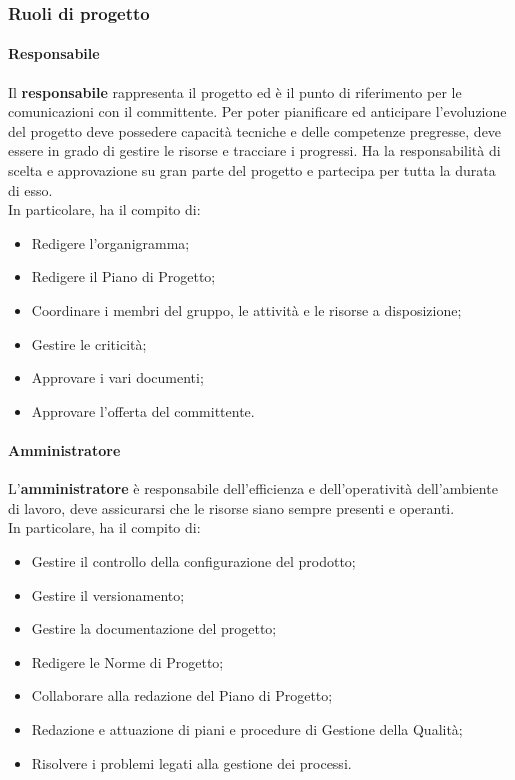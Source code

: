 \documentclass[../norme_di_progetto.tex]{subfiles}
\begin{document}
    \subsubsection{Ruoli di progetto}
        \paragraph{Responsabile}
        Il \textbf{responsabile} rappresenta il progetto ed è il punto di riferimento per le comunicazioni con il committente. Per poter pianificare ed anticipare l'evoluzione del progetto deve possedere capacità tecniche e delle competenze pregresse, deve essere in grado di gestire le risorse e tracciare i progressi. Ha la responsabilità di scelta e approvazione su gran parte del progetto e partecipa per tutta la durata di esso.\\
        In particolare, ha il compito di:
        \begin{itemize}
            \item Redigere l'organigramma;
            \item Redigere il Piano di Progetto;
            \item Coordinare i membri del gruppo, le attività e le risorse a disposizione;
            \item Gestire le criticità;
            \item Approvare i vari documenti;
            \item Approvare l'offerta del committente.
        \end{itemize}

        \paragraph{Amministratore}
        L'\textbf{amministratore} è responsabile dell'efficienza e dell'operatività dell'ambiente di lavoro, deve assicurarsi che le risorse siano sempre presenti e operanti.\\
        In particolare, ha il compito di:
        \begin{itemize}
            \item Gestire il controllo della configurazione del prodotto;
            \item Gestire il versionamento;
            \item Gestire la documentazione del progetto;
            \item Redigere le Norme di Progetto;
            \item Collaborare alla redazione del Piano di Progetto;
            \item Redazione e attuazione di piani e procedure di Gestione della Qualità;
            \item Risolvere i problemi legati alla gestione dei processi.
        \end{itemize}
        
\end{document}
